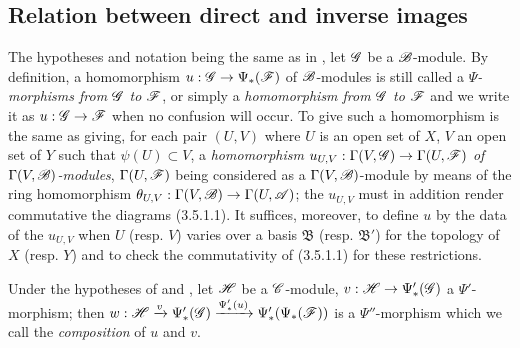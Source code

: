 \subsection{Relation between direct and inverse images}
\label{subsection:0.4.4}

\begin{env}[4.4.1]
\label{0.4.4.1}
The hypotheses and notation being the same as in , let
$\mathscr{G}$ be a $\mathscr{B}$-module. By definition, a homomorphism
$u:\sh{G}\to\Psi_*(\sh{F})$ of $\mathscr{B}$-modules is still called a
\emph{$\Psi$-morphisms from $\mathscr{G}$ to $\mathscr{F}$}, or simply a
\emph{homomorphism from $\mathscr{G}$ to $\mathscr{F}$} and we write it as
$u:\sh{G}\to\sh{F}$ when no confusion will occur. To give such a homomorphism is
the same as giving, for each pair $(U,V)$ where $U$ is an open set of $X$, $V$
an open set of $Y$ such that $\psi(U)\subset V$, a \emph{homomorphism
$u_{U,V}:\Gamma(V,\sh{G})\to\Gamma(U,\sh{F})$ of $\Gamma(V,\mathscr{B})$-modules},
$\Gamma(U,\mathscr{F})$ being considered as a $\Gamma(V,\mathscr{B})$-module by means of
the ring homomorphism $\theta_{U,V}:\Gamma(V,\sh{B})\to\Gamma(U,\sh{A})$; the
$u_{U,V}$ must in addition render commutative the diagrams (3.5.1.1). It
suffices, moreover, to define $u$ by the data of the $u_{U,V}$ when $U$
(resp. $V$) varies over a basis $\mathfrak{B}$ (resp. $\mathfrak{B}'$) for the
topology of $X$ (resp. $Y$) and to check the commutativity of (3.5.1.1) for
these restrictions.
\end{env}

\begin{env}[4.4.2]
\label{0.4.4.2}
Under the hypotheses of  and , let $\mathscr{H}$ be
a $\mathscr{C}$-module, $v:\sh{H}\to\Psi_*'(\sh{G})$ a $\Psi'$-morphism; then
$w:\mathscr{H}\xrightarrow{v}\Psi_*'(\mathscr{G})\xrightarrow{\Psi_*'(u)}\Psi_*'(\Psi_*(\mathscr{F}))$
is a $\Psi''$-morphism which we call the \emph{composition} of $u$ and $v$.
\end{env}

